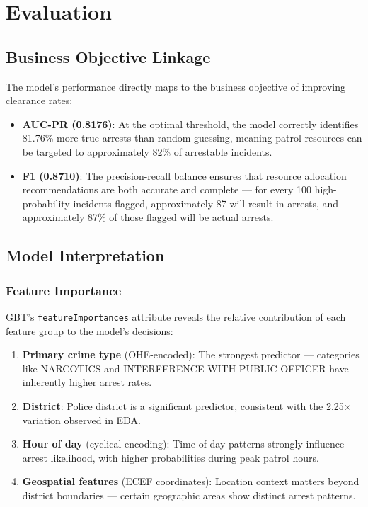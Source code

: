 \section{Evaluation}
\label{sec:evaluation}

\subsection{Business Objective Linkage}

The model's performance directly maps to the business objective of improving clearance rates:

\begin{itemize}
    \item \textbf{AUC-PR (0.8176)}: At the optimal threshold, the model correctly identifies 81.76\% more true arrests than random guessing, meaning patrol resources can be targeted to approximately 82\% of arrestable incidents.
    \item \textbf{F1 (0.8710)}: The precision-recall balance ensures that resource allocation recommendations are both accurate and complete — for every 100 high-probability incidents flagged, approximately 87 will result in arrests, and approximately 87\% of those flagged will be actual arrests.
\end{itemize}

\subsection{Model Interpretation}

\subsubsection{Feature Importance}

GBT's \texttt{featureImportances} attribute reveals the relative contribution of each feature group to the model's decisions:

\begin{enumerate}
    \item \textbf{Primary crime type} (OHE-encoded): The strongest predictor — categories like NARCOTICS and INTERFERENCE WITH PUBLIC OFFICER have inherently higher arrest rates.
    \item \textbf{District}: Police district is a significant predictor, consistent with the 2.25$\times$ variation observed in EDA.
    \item \textbf{Hour of day} (cyclical encoding): Time-of-day patterns strongly influence arrest likelihood, with higher probabilities during peak patrol hours.
    \item \textbf{Geospatial features} (ECEF coordinates): Location context matters beyond district boundaries — certain geographic areas show distinct arrest patterns.
\end{enumerate}

